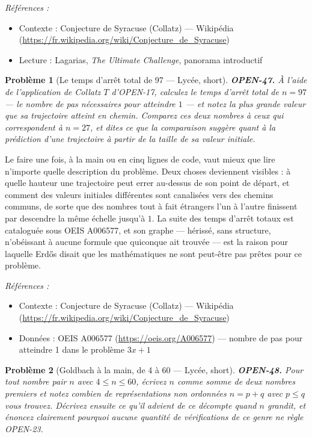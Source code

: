 \documentclass[11pt]{article}
\newtheorem{problem}{Problème}
\newenvironment{refs}{\par\small\noindent\emph{Références :}\begin{itemize}\setlength\itemsep{0pt}}{\end{itemize}\normalsize}
\begin{document}
\begin{refs}
\item Contexte : Conjecture de Syracuse (Collatz) --- Wikipédia (\url{https://fr.wikipedia.org/wiki/Conjecture_de_Syracuse})
\item Lecture : Lagarias, \textit{The Ultimate Challenge}, panorama introductif
\end{refs}

\bigskip

\begin{problem}[{Le temps d'arrêt total de 97 --- Lycée, short}]
\textbf{OPEN-47.} À l'aide de l'application de Collatz $ T $
d'OPEN-17, calculez le temps d'arrêt total de $ n = 97 $ --- le nombre de pas nécessaires
pour atteindre $ 1 $ --- et notez la plus grande valeur que sa trajectoire atteint en
chemin. Comparez ces deux nombres à ceux qui correspondent à $ n = 27 $, et dites ce que
la comparaison suggère quant à la prédiction d'une trajectoire à partir de la taille de sa
valeur initiale.
\end{problem}

\noindent Le faire une fois, à la main ou en cinq lignes de code, vaut mieux que
lire n'importe quelle description du problème. Deux choses deviennent visibles : à quelle
hauteur une trajectoire peut errer au-dessus de son point de départ, et comment des
valeurs initiales différentes sont canalisées vers des chemins communs, de sorte que des
nombres tout à fait étrangers l'un à l'autre finissent par descendre la même échelle
jusqu'à $ 1 $. La suite des temps d'arrêt totaux est cataloguée sous OEIS A006577, et
son graphe --- hérissé, sans structure, n'obéissant à aucune formule que quiconque ait
trouvée --- est la raison pour laquelle Erd\H{o}s disait que les mathématiques ne sont
peut-être pas prêtes pour ce problème.

\begin{refs}
\item Contexte : Conjecture de Syracuse (Collatz) --- Wikipédia (\url{https://fr.wikipedia.org/wiki/Conjecture_de_Syracuse})
\item Données : OEIS A006577 (\url{https://oeis.org/A006577}) --- nombre de pas pour atteindre 1 dans le problème $ 3x+1 $
\end{refs}

\bigskip

\begin{problem}[{Goldbach à la main, de 4 à 60 --- Lycée, short}]
\textbf{OPEN-48.} Pour tout nombre pair $ n $ avec
$ 4 \leq n \leq 60 $, écrivez $ n $ comme somme de deux nombres premiers et notez
combien de représentations non ordonnées $ n = p + q $ avec $ p \leq q $ vous trouvez.
Décrivez ensuite ce qu'il advient de ce décompte quand $ n $ grandit, et énoncez
clairement pourquoi aucune quantité de vérifications de ce genre ne règle OPEN-23.
\end{problem}
\end{document}
